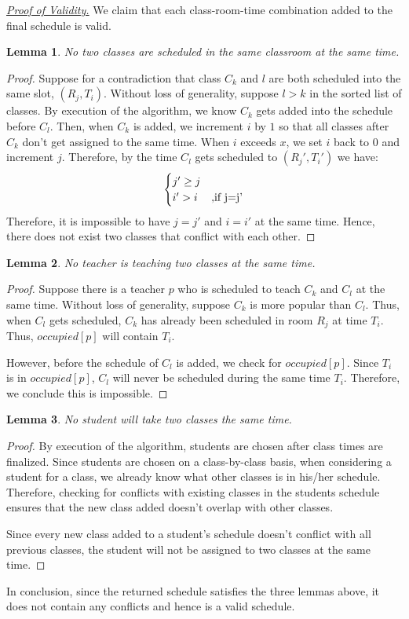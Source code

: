 \documentclass[11pt, oneside]{article}   	%
\newtheorem*{lem}{Lemma}
\begin{document}
\underline{\textit{Proof of Validity.}}
We claim that each class-room-time combination added to the final schedule is valid. \\ \par
\begin{lem}No two classes are scheduled in the same classroom at the same time.\end{lem}
\begin{proof}Suppose for a contradiction that class $C_k$ and $l$ are both scheduled into the same slot, $(R_j, T_i)$. Without loss of generality, suppose $l>k$ in the sorted list of classes. By execution of the algorithm, we know $C_k$ gets added into the schedule before $C_l$. Then, when $C_k$ is added, we increment $i$ by $1$ so that all classes after $C_k$ don't get assigned to the same time. When $i$ exceeds $x$, we set $i$ back to $0$ and increment $j$. Therefore, by the time $C_l$ gets scheduled to $(R_j', T_i')$ we have:
\[ \begin{cases} j'\geq j \\i'>i& \text{,if } $j=j'$ \end{cases}\]
Therefore, it is impossible to have $j=j'$ and $i=i'$ at the same time. Hence, there does not exist two classes that conflict with each other. \end{proof}
\begin{lem}No teacher is teaching two classes at the same time.\end{lem}
\begin{proof}Suppose there is a teacher $p$ who is scheduled to teach $C_k$ and $C_l$ at the same time. Without loss of generality, suppose $C_k$ is more popular than $C_l$. Thus, when $C_l$ gets scheduled, $C_k$ has already been scheduled in room $R_j$ at time $T_i$. Thus, $occupied[p]$ will contain $T_i$.\par
However, before the schedule of $C_l$ is added, we check for $occupied[p]$. Since $T_i$ is in $occupied[p]$, $C_l$ will never be scheduled during the same time $T_i$. Therefore, we conclude this is impossible. 
\end{proof}

\begin{lem}No student will take two classes the same time.\end{lem}
\begin{proof}By execution of the algorithm, students are chosen after class times are finalized. Since students are chosen on a class-by-class basis, when considering a student for a class, we already know what other classes is in his/her schedule. Therefore, checking for conflicts with existing classes in the students schedule ensures that the new class added doesn't overlap with other classes. \par
Since every new class added to a student's schedule doesn't conflict with all previous classes, the student will not be assigned to two classes at the same time.
\end{proof}
In conclusion, since the returned schedule satisfies the three lemmas above, it does not contain any conflicts and hence is a valid schedule.
\end{document}
